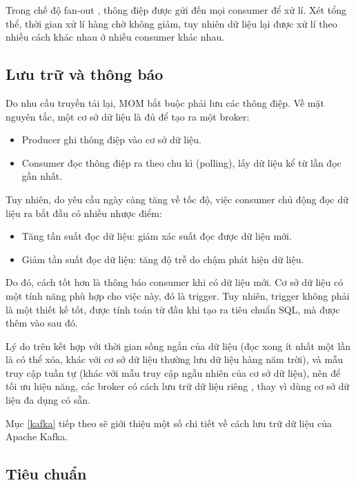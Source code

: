 \documentclass{article}
\begin{document}
Trong chế độ fan-out \cite{waitingforcode2019}, thông điệp được gửi đến mọi
consumer để xử lí. Xét tổng thể, thời gian xử lí hàng chờ không giảm, tuy nhiên
dữ liệu lại được xử lí theo nhiều cách khác nhau ở nhiều consumer khác nhau.

\subsection{Lưu trữ và thông báo}

Do nhu cầu truyền tải lại, MOM bắt buộc phải lưu các thông điệp. Về mặt nguyên
tắc, một cơ sở dữ liệu là đủ để tạo ra một broker:

\begin{itemize}
    \item Producer ghi thông điệp vào cơ sở dữ liệu.
    \item Consumer đọc thông điệp ra theo chu kì (polling), lấy dữ liệu kể từ
    lần đọc gần nhất.
\end{itemize}

Tuy nhiên, do yêu cầu ngày càng tăng về tốc độ, việc consumer chủ động đọc dữ
liệu ra bắt đầu có nhiều nhược điểm:

\begin{itemize}
    \item Tăng tần suất đọc dữ liệu: giảm xác suất đọc được dữ liệu mới.
    \item Giảm tần suất đọc dữ liệu: tăng độ trễ do chậm phát hiện dữ liệu.
\end{itemize}

Do đó, cách tốt hơn là thông báo consumer khi có dữ liệu mới. Cơ sở dữ liệu có
một tính năng phù hợp cho việc này, đó là trigger. Tuy nhiên, trigger không phải
là một thiết kế tốt, được tính toán từ đầu khi tạo ra tiêu chuẩn SQL, mà được
thêm vào sau đó.

Lý do trên kết hợp với thời gian sống ngắn của dữ liệu (đọc xong ít nhất một lần
là có thể xóa, khác với cơ sở dữ liệu thường lưu dữ liệu hàng năm trời), và mẫu
truy cập tuần tự (khác với mẫu truy cập ngẫu nhiên của cơ sở dữ liệu), nên để
tối ưu hiệu năng, các broker có cách lưu trữ dữ liệu riêng
\cite{monitor_stream}, thay vì dùng cơ sở dữ liệu đa dụng có sẵn.

Mục \ref{kafka} tiếp theo sẽ giới thiệu một số chi tiết về cách lưu trữ dữ liệu
của Apache Kafka.

\subsection{Tiêu chuẩn}
\end{document}
